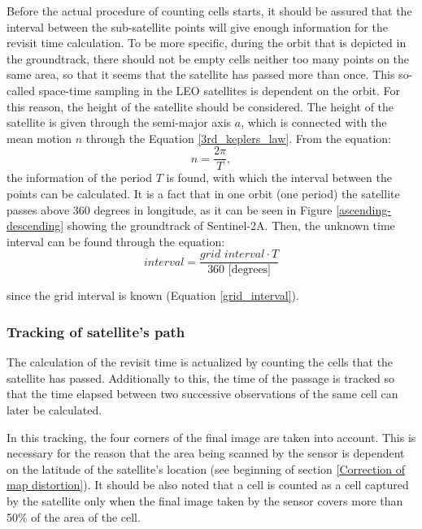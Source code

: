 Before the actual procedure of counting cells starts, it should be assured that the interval between the sub-satellite points will give enough information for the revisit time calculation. To be more specific, during the orbit that is depicted in the groundtrack, there should not be empty cells neither too many points on the same area, so that it seems that the satellite has passed more than once. This so-called space-time sampling in the LEO satellites is dependent on the orbit. For this reason, the height of the satellite should be considered. The height of the satellite is given through the semi-major axis $a$, which is connected with the mean motion $n$ through the Equation \ref{3rd_keplers_law}. From the equation: $$n = \frac{2 \pi}{T}, $$
the information of the period $T$ is found, with which the interval between the points can be calculated. It is a fact that in one orbit (one period) the satellite passes above 360 degrees in longitude, as it can be seen in Figure \ref{ascending-descending} showing the groundtrack of Sentinel-2A. Then, the unknown time interval can be found through the equation:
\begin{equation}
\textit{interval} = \frac{\textit{grid interval} \cdot T}{360 \text{ [degrees]}}
\end{equation}

since the grid interval is known (Equation \ref{grid_interval}).


\bigskip
\subsubsection{Tracking of satellite's path}
\bigskip

The calculation of the revisit time is actualized by counting the cells that the satellite has passed. Additionally to this, the time of the passage is tracked so that the time elapsed between two successive observations of the same cell can later be calculated. 

In this tracking, the four corners of the final image are taken into account. This is necessary for the reason that the area being scanned by the sensor is dependent on the latitude of the satellite's location (see beginning of section \ref{Correction of map distortion}). It should be also noted that a cell is counted as a cell captured by the satellite only when the final image taken by the sensor covers more than 50\% of the area of the cell.


